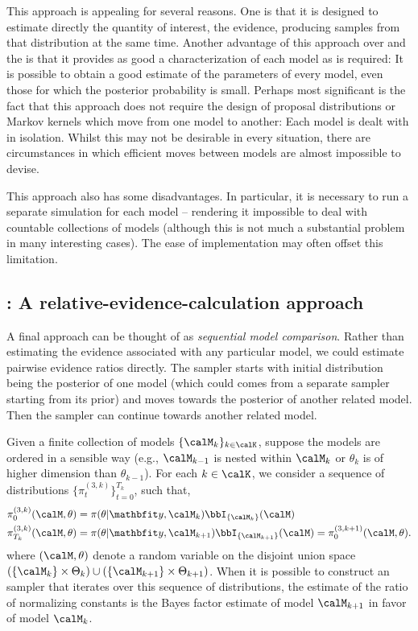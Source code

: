 This approach is appealing for several reasons. One is that it is designed to estimate directly the quantity of interest, the evidence, producing samples from that distribution at the same time. Another advantage of this approach over \smc[1] and the \rjmcmc is that it provides as good a characterization of each model as is required: It is possible to obtain a good estimate of the parameters of every model, even those for which the posterior probability is small. Perhaps most significant is the fact that this approach does not require the design of proposal distributions or Markov kernels which move from one model to another: Each model is dealt with in isolation. Whilst this may not be desirable in every situation, there are circumstances in which efficient moves between models are almost impossible to devise.

This approach also has some disadvantages. In particular, it is necessary to run a separate simulation for each model -- rendering it impossible to deal with countable collections of models (although this is not much  a substantial problem in many interesting cases). The ease of implementation may often offset this limitation.

\subsection[SMC3: A relative-evidence-calculation approach]{\smc[3]: A relative-evidence-calculation approach}
\label{sub:smc3: A relative-evidence-calculation approach}

A final approach can be thought of as \emph{sequential model comparison}. Rather than estimating the evidence associated with any particular model, we could estimate pairwise evidence ratios directly. The \smc sampler starts with  initial distribution being the posterior of one model (which could comes from a separate \smc sampler starting from its prior) and moves towards the posterior of another related model. Then the sampler can continue towards another related model.

Given a finite collection of models $\{\calM_k\}_{k\in\calK}$, suppose the models are ordered in a sensible way (e.g., $\calM_{k-1}$ is nested within $\calM_k$ or $\theta_k$ is of higher dimension than $\theta_{k-1}$). For each $k\in\calK$, we consider a sequence of distributions $\{\pi_t^{(3,k)}\}_{t=0}^{T_k}$, such that,
\begin{align*}
  \pi_0^{(3,k)}(\calM,\theta) &=
  \pi(\theta|\data,\calM_k) \bbI_{\{\calM_k\}}(\calM) \\
  \pi_{T_k}^{(3,k)}(\calM,\theta) &=
  \pi(\theta|\data,\calM_{k+1})
  \bbI_{\{\calM_{k+1}\}}(\calM) = \pi_{0}^{(3,k+1)}(\calM,\theta).
\end{align*}
where $(\calM,\theta)$ denote a random variable on the disjoint union space $(\{\calM_k\}\times\Theta_k)\cup(\{\calM_{k+1}\}\times\Theta_{k+1})$. When it is possible to construct an \smc sampler that iterates over this sequence of distributions, the estimate of the ratio of normalizing constants is the Bayes factor estimate of model $\calM_{k+1}$ in favor of model $\calM_k$.

